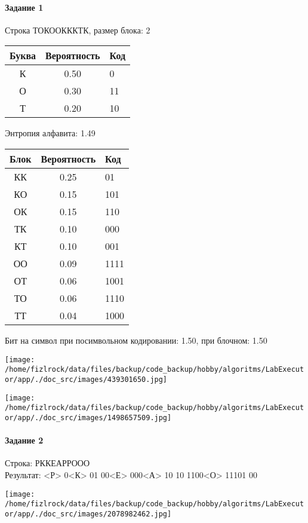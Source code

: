 \documentclass[a4paper, 12pt]{article}
\begin{document}
\paragraph{Задание 1}

Строка ТОКООКККТК, размер блока: 2
\begin{center}
 \begin{tabular}{ |c|c|l| } 
  \hline
     Буква & Вероятность & Код\\ \hline
К & 0.50 & 0\\\hline
О & 0.30 & 11\\\hline
Т & 0.20 & 10
\\ \hline \end{tabular}
\end{center}
Энтропия алфавита: 1.49
\begin{center}
 \begin{tabular}{ |c|c|l| } 
  \hline
     Блок & Вероятность & Код\\ \hline
КК & 0.25 & 01\\\hline
КО & 0.15 & 101\\\hline
ОК & 0.15 & 110\\\hline
ТК & 0.10 & 000\\\hline
КТ & 0.10 & 001\\\hline
ОО & 0.09 & 1111\\\hline
ОТ & 0.06 & 1001\\\hline
ТО & 0.06 & 1110\\\hline
ТТ & 0.04 & 1000
\\ \hline \end{tabular}
\end{center}
Бит на символ при посимвольном кодировании: 1.50, при блочном: 1.50

\texttt{[image: /home/fizlrock/data/files/backup/code\_backup/hobby/algoritms/LabExecutor/app/./doc\_src/images/439301650.jpg]}

\texttt{[image: /home/fizlrock/data/files/backup/code\_backup/hobby/algoritms/LabExecutor/app/./doc\_src/images/1498657509.jpg]}
\pagebreak
\paragraph{Задание 2}

Строка: 
РККЕАРРООО\\
Результат: <Р> 0<К> 01 00<Е> 000<А> 10 10 1100<О> 11101 00

\texttt{[image: /home/fizlrock/data/files/backup/code\_backup/hobby/algoritms/LabExecutor/app/./doc\_src/images/2078982462.jpg]}
\end{document}
